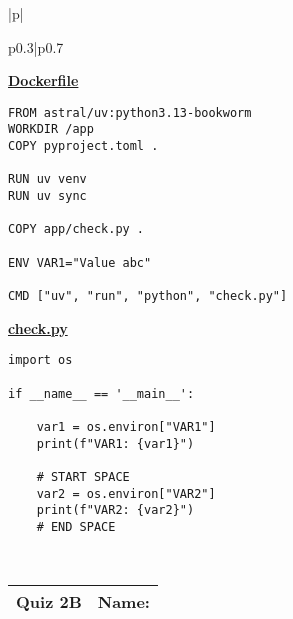 \documentclass[11pt]{article}
\begin{document}
\begin{table}[h]
\begin{tabular}{|p{\textwidth}|}
\begin{tabular}{p{0.3\textwidth}|p{0.7\textwidth}}
\begin{minipage}[t]{\linewidth}
\underline{\textbf{Dockerfile}}
\begin{verbatim}
FROM astral/uv:python3.13-bookworm
WORKDIR /app
COPY pyproject.toml .

RUN uv venv
RUN uv sync

COPY app/check.py .

ENV VAR1="Value abc"

CMD ["uv", "run", "python", "check.py"]
\end{verbatim}

\vspace{10pt}

\underline{\textbf{check.py}}
\begin{verbatim}
import os

if __name__ == '__main__':

    var1 = os.environ["VAR1"]
    print(f"VAR1: {var1}")

    # START SPACE
    var2 = os.environ["VAR2"]
    print(f"VAR2: {var2}")
    # END SPACE
\end{verbatim}

\end{minipage}
\end{tabular} \\
\hline
\end{tabular}
\end{table}

\newpage

\begin{tabularx}{\textwidth}{l|X}
    \textbf{Quiz 2B} &   \textbf{Name: } \\
    \hline 
    \end{tabularx}
\end{document}
